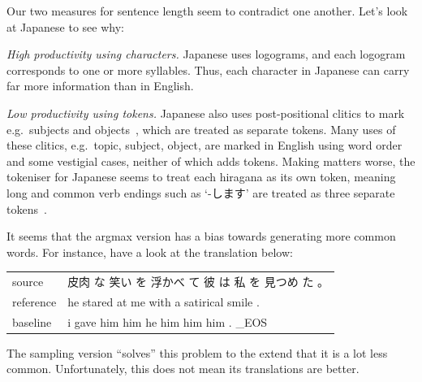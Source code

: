 \documentclass[answers]{exam}
\begin{document}
\begin{CJK}{UTF8}{min}
\begin{questions}
\begin{framed}
  Our two measures for sentence length seem to contradict one another. Let's
  look at Japanese to see why:
  \begin{compactitem}
  \item {\it High productivity using characters.}
    Japanese uses logograms, and each logogram corresponds to one or more
    syllables. Thus, each character in Japanese can carry far more information
    than in English.
  \item {\it Low productivity using tokens.}
    Japanese also uses post-positional clitics to mark e.g.\ subjects and
    objects~\citep{Hinds-1986}, which are treated as separate tokens.
    Many uses of these clitics, e.g.\ topic, subject, object, are marked in
    English using word order and some vestigial cases, neither of which adds
    tokens.
    Making matters worse, the tokeniser for Japanese seems to treat each
    hiragana as its own token, meaning long and common verb endings such as
    `-します' are treated as three separate
    tokens~\citep{Minna-1998}.
  \end{compactitem}
\end{framed}


\begin{framed}
\begin{compactenum}[1.]
\item
  It seems that the argmax version has a bias towards generating more common
  words. For instance, have a look at the translation below:

  \begin{tabular}{ll}
    source    & 皮肉 な 笑い を 浮かべ て 彼 は 私 を 見つめ た 。\\
    reference & he stared at me with a satirical smile .\\
    baseline  & i gave him him he him him him . \_EOS\\
  \end{tabular}

  The sampling version ``solves'' this problem to the extend that it is a lot
  less common. Unfortunately, this does not mean its translations are better.


\end{compactenum}
\end{framed}
\end{questions}
\end{CJK}
\end{document}
